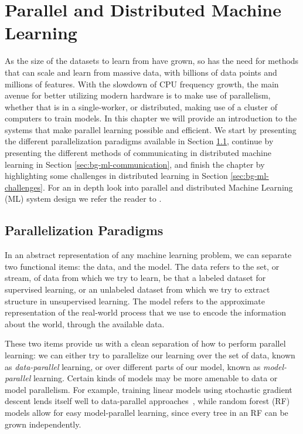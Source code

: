 \chapter{Parallel and Distributed Machine Learning}
\label{ch:bg-parallel-ml}

As the size of the datasets to learn from have grown, so has the need for methods that
can scale and learn from massive data, with billions of data points and millions
of features. With the slowdown of CPU frequency
growth, the main avenue for better utilizing modern hardware is to make use
of parallelism, whether that is in a single-worker, or distributed,
making use of a cluster of computers to train models. In this chapter we
will provide an introduction to the systems that make
parallel learning possible and efficient. We start by presenting the
different parallelization paradigms available in Section \ref{sec:bg-ml-paradigms},
continue by presenting the different methods of communicating in
distributed machine learning in Section \ref{sec:bg-ml-communication},
and finish the chapter by highlighting some challenges in
distributed learning in Section \ref{sec:bg-ml-challenges}.
For an in depth look into parallel and distributed Machine Learning (ML)
system design we refer the reader to \cite{distributed-ml-design}.

\section{Parallelization Paradigms}
\label{sec:bg-ml-paradigms}

In an abstract representation of any machine learning problem, we can separate
two functional items: the data, and the model. The data refers to the set, or stream, of data from which we try to learn, be that a labeled dataset for
supervised learning, or an unlabeled dataset from which we try to extract
structure in unsupervised learning. The model refers to the approximate representation
of the real-world process that we use to encode the information about the world,
through the available data.

These two items provide us with a clean separation of how to perform
parallel learning: we can either try to parallelize our learning over the set
of data, known as \emph{data-parallel} learning, or over different parts of
our model, known as \emph{model-parallel} learning. Certain kinds of models
may be more amenable to data or model parallelism. For example, training
linear models using stochastic gradient descent lends itself well to
data-parallel approaches~\cite{dekel-optimal-distributed}, while random
forest (RF) models allow for easy model-parallel learning,
since every tree in an RF can be grown independently.

